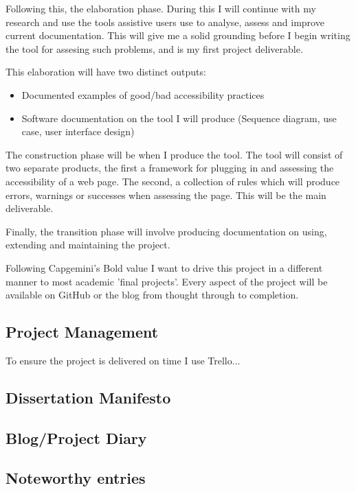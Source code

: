Following this, the elaboration phase. During this I will continue with my research and use the tools assistive users use to analyse,
assess and improve current documentation. This will give me a solid grounding before I begin writing the tool for assesing such problems,
 and is my first project deliverable.

This elaboration will have two distinct outputs:
\begin{itemize}
  \item Documented examples of good/bad accessibility practices
  \item Software documentation on the tool I will produce (Sequence diagram, use case, user interface design)
\end{itemize}

The construction phase will be when I produce the tool. The tool will consist of two separate products, the first a framework for plugging
in and assessing the accessibility of a web page. The second, a collection of rules which will produce errors, warnings or successes when
assessing the page. This will be the main deliverable.

Finally, the transition phase will involve producing documentation on using, extending and maintaining the project.

Following Capgemini's Bold value I want to drive this project in a different manner to most academic 'final projects'. Every aspect of the
project will be available on GitHub or the blog from thought through to completion.

\subsection{Project Management}
To ensure the project is delivered on time I use Trello...

\subsection{Dissertation Manifesto}

\subsection{Blog/Project Diary}

\subsection{Noteworthy entries}

